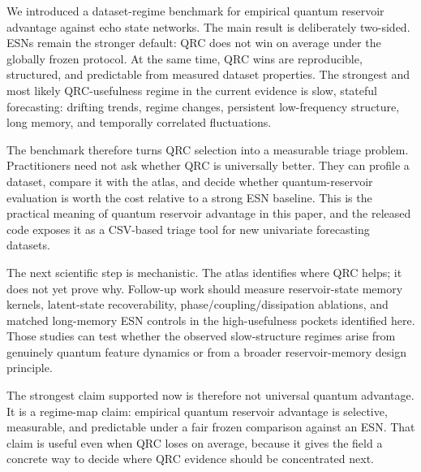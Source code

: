 We introduced a dataset-regime benchmark for empirical quantum reservoir advantage against echo state networks. The main result is deliberately two-sided. ESNs remain the stronger default: QRC does not win on average under the globally frozen protocol. At the same time, QRC wins are reproducible, structured, and predictable from measured dataset properties. The strongest and most likely QRC-usefulness regime in the current evidence is slow, stateful forecasting: drifting trends, regime changes, persistent low-frequency structure, long memory, and temporally correlated fluctuations.

The benchmark therefore turns QRC selection into a measurable triage problem. Practitioners need not ask whether QRC is universally better. They can profile a dataset, compare it with the atlas, and decide whether quantum-reservoir evaluation is worth the cost relative to a strong ESN baseline. This is the practical meaning of quantum reservoir advantage in this paper, and the released code exposes it as a CSV-based triage tool for new univariate forecasting datasets.

The next scientific step is mechanistic. The atlas identifies where QRC helps; it does not yet prove why. Follow-up work should measure reservoir-state memory kernels, latent-state recoverability, phase/coupling/dissipation ablations, and matched long-memory ESN controls in the high-usefulness pockets identified here. Those studies can test whether the observed slow-structure regimes arise from genuinely quantum feature dynamics or from a broader reservoir-memory design principle.

The strongest claim supported now is therefore not universal quantum advantage. It is a regime-map claim: empirical quantum reservoir advantage is selective, measurable, and predictable under a fair frozen comparison against an ESN. That claim is useful even when QRC loses on average, because it gives the field a concrete way to decide where QRC evidence should be concentrated next.
